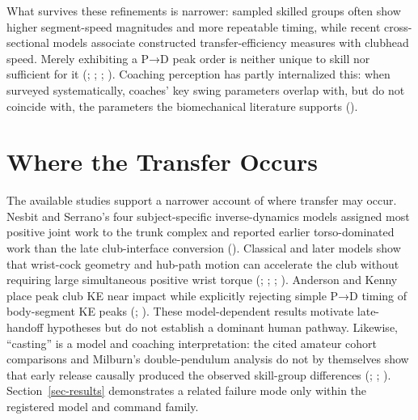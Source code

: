 \documentclass[
  letterpaper,
]{report}
\begin{document}
What survives these refinements is narrower: sampled skilled groups
often show higher segment-speed magnitudes and more repeatable timing,
while recent cross-sectional models associate constructed
transfer-efficiency measures with clubhead speed. Merely exhibiting a
P→D peak order is neither unique to skill nor sufficient for it
(;
;
;
). Coaching
perception has partly internalized this: when surveyed systematically,
coaches' key swing parameters overlap with, but do not coincide with,
the parameters the biomechanical literature supports
().

\section{Where the Transfer Occurs}\label{sec-where}

The available studies support a narrower account of where transfer may
occur. Nesbit and Serrano's four subject-specific inverse-dynamics
models assigned most positive joint work to the trunk complex and
reported earlier torso-dominated work than the late club-interface
conversion ().
Classical and later models show that wrist-cock geometry and hub-path
motion can accelerate the club without requiring large simultaneous
positive wrist torque (;
;
;
). Anderson and
Kenny place peak club KE near impact while explicitly rejecting simple
P→D timing of body-segment KE peaks
(;
). These model-dependent
results motivate late-handoff hypotheses but do not establish a dominant
human pathway. Likewise, ``casting'' is a model and coaching
interpretation: the cited amateur cohort comparisons and Milburn's
double-pendulum analysis do not by themselves show that early release
causally produced the observed skill-group differences
(;
;
). Section~\ref{sec-results}
demonstrates a related failure mode only within the registered model and
command family.
\end{document}
